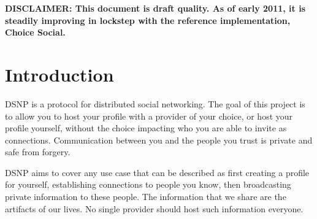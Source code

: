 \documentclass[letterpaper,11pt,oneside]{article}
\begin{document}
{\noindent\bf\large DISCLAIMER: This document is draft quality. As of early
2011, it is steadily improving in lockstep with the reference implementation,
Choice Social.}

\newpage

\tableofcontents

%
%


%
%
%


\section{Introduction}

%
%
% 

DSNP is a protocol for distributed social networking. The goal of this project
is to allow you to host your profile with a provider of your choice, or host
your profile yourself, without the choice impacting who you are able to invite
as connections. Communication between you and the people you trust is private
and safe from forgery.

DSNP aims to cover any use case that can be described as first creating a
profile for yourself, establishing connections to people you know, then
broadcasting private information to these people. The information that we share
are the artifacts of our lives. No single provider should host such information
everyone.
\end{document}
